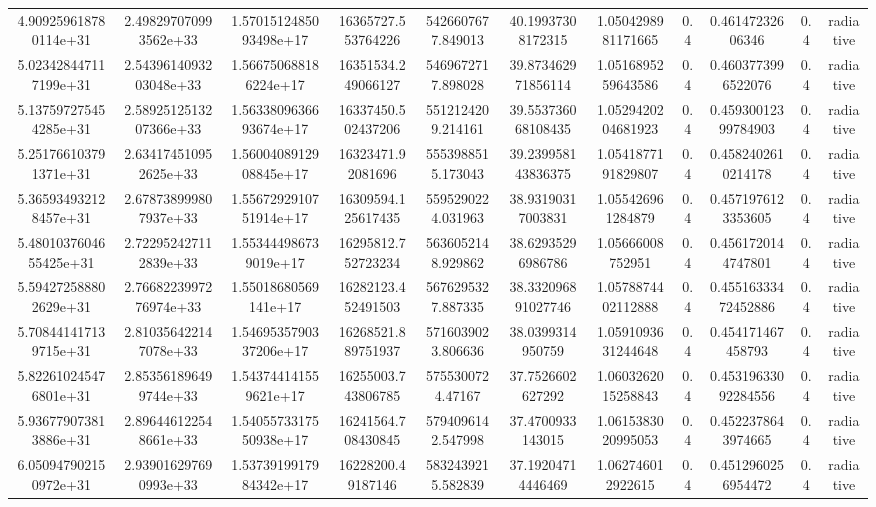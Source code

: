 \begin{table}
\begin{tabular}{ccccccccccc}
4.909259618780114e+31 & 2.498297070993562e+33 & 1.5701512485093498e+17 & 16365727.553764226 & 5426607677.849013 & 40.19937308172315 & 1.0504298981171665 & 0.4 & 0.46147232606346 & 0.4 & radiative \\
5.023428447117199e+31 & 2.5439614093203048e+33 & 1.566750688186224e+17 & 16351534.249066127 & 5469672717.898028 & 39.873462971856114 & 1.0516895259643586 & 0.4 & 0.4603773996522076 & 0.4 & radiative \\
5.137597275454285e+31 & 2.5892512513207366e+33 & 1.5633809636693674e+17 & 16337450.502437206 & 5512124209.214161 & 39.553736068108435 & 1.0529420204681923 & 0.4 & 0.45930012399784903 & 0.4 & radiative \\
5.251766103791371e+31 & 2.634174510952625e+33 & 1.5600408912908845e+17 & 16323471.92081696 & 5553988515.173043 & 39.239958143836375 & 1.0541877191829807 & 0.4 & 0.4582402610214178 & 0.4 & radiative \\
5.365934932128457e+31 & 2.678738999807937e+33 & 1.5567292910751914e+17 & 16309594.125617435 & 5595290224.031963 & 38.93190317003831 & 1.055426961284879 & 0.4 & 0.4571976123353605 & 0.4 & radiative \\
5.4801037604655425e+31 & 2.722952427112839e+33 & 1.553444986739019e+17 & 16295812.752723234 & 5636052148.929862 & 38.62935296986786 & 1.05666008752951 & 0.4 & 0.4561720144747801 & 0.4 & radiative \\
5.594272588802629e+31 & 2.7668223997276974e+33 & 1.55018680569141e+17 & 16282123.452491503 & 5676295327.887335 & 38.332096891027746 & 1.0578874402112888 & 0.4 & 0.45516333472452886 & 0.4 & radiative \\
5.708441417139715e+31 & 2.810356422147078e+33 & 1.5469535790337206e+17 & 16268521.889751937 & 5716039023.806636 & 38.0399314950759 & 1.0591093631244648 & 0.4 & 0.454171467458793 & 0.4 & radiative \\
5.822610245476801e+31 & 2.853561896499744e+33 & 1.543744141559621e+17 & 16255003.743806785 & 5755300724.47167 & 37.7526602627292 & 1.0603262015258843 & 0.4 & 0.45319633092284556 & 0.4 & radiative \\
5.936779073813886e+31 & 2.896446122548661e+33 & 1.5405573317550938e+17 & 16241564.708430845 & 5794096142.547998 & 37.4700933143015 & 1.0615383020995053 & 0.4 & 0.4522378643974665 & 0.4 & radiative \\
6.050947902150972e+31 & 2.939016297690993e+33 & 1.5373919917984342e+17 & 16228200.49187146 & 5832439215.582839 & 37.19204714446469 & 1.062746012922615 & 0.4 & 0.4512960256954472 & 0.4 & radiative \\

\end{tabular}
\end{table}

